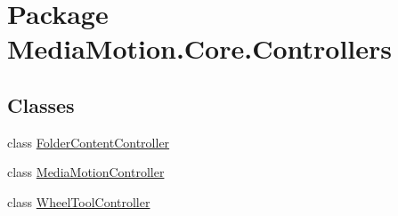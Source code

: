 \hypertarget{namespace_media_motion_1_1_core_1_1_controllers}{\section{Package Media\+Motion.\+Core.\+Controllers}
\label{namespace_media_motion_1_1_core_1_1_controllers}
}
\subsection*{Classes}
\begin{DoxyCompactItemize}
\item 
class \hyperlink{class_media_motion_1_1_core_1_1_controllers_1_1_folder_content_controller}{Folder\+Content\+Controller}
\item 
class \hyperlink{class_media_motion_1_1_core_1_1_controllers_1_1_media_motion_controller}{Media\+Motion\+Controller}
\item 
class \hyperlink{class_media_motion_1_1_core_1_1_controllers_1_1_wheel_tool_controller}{Wheel\+Tool\+Controller}
\end{DoxyCompactItemize}
